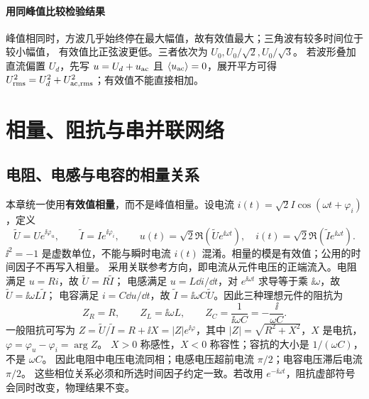 
\paragraph{用同峰值比较检验结果}
峰值相同时，方波几乎始终停在最大幅值，故有效值最大；三角波有较多时间位于较小幅值，
有效值比正弦波更低。三者依次为 $U_0,U_0/\sqrt2,U_0/\sqrt3$。
若波形叠加直流偏置 $U_d$，先写 $u=U_d+u_{\rm ac}$ 且 $\langle u_{\rm ac}\rangle=0$，展开平方可得
$U_{\rm rms}^2=U_d^2+U_{{\rm ac,rms}}^2$；有效值不能直接相加。




\section{相量、阻抗与串并联网络}

\subsection{电阻、电感与电容的相量关系}


本章统一使用\textbf{有效值相量}，而不是峰值相量。设电流
$i(t)=\sqrt2 I\cos(\omega t+\varphi_i)$，定义
\begin{equation}
 \widetilde U=Ue^{\ii\varphi_u},\qquad
 \widetilde I=Ie^{\ii\varphi_i},\qquad
 u(t)=\sqrt2\Re(\widetilde Ue^{\ii\omega t}),\quad
 i(t)=\sqrt2\Re(\widetilde Ie^{\ii\omega t}).
\end{equation}
$\ii^2=-1$ 是虚数单位，不能与瞬时电流 $i(t)$ 混淆。相量的模是有效值；公用的时间因子不再写入相量。
采用关联参考方向，即电流从元件电压的正端流入。电阻满足 $u=Ri$，故 $\widetilde U=R\widetilde I$；
电感满足 $u=L\dd i/\dd t$，对 $e^{\ii\omega t}$ 求导等于乘 $\ii\omega$，故 $\widetilde U=\ii\omega L\widetilde I$；
电容满足 $i=C\dd u/\dd t$，故 $\widetilde I=\ii\omega C\widetilde U$。因此三种理想元件的阻抗为
\begin{equation}
 Z_R=R,\qquad Z_L=\ii\omega L,\qquad Z_C=\frac1{\ii\omega C}=-\frac{\ii}{\omega C}.
\end{equation}
一般阻抗可写为 $Z=\widetilde U/\widetilde I=R+\ii X=|Z|e^{\ii\varphi}$，其中
$|Z|=\sqrt{R^2+X^2}$，$X$ 是电抗，$\varphi=\varphi_u-\varphi_i=\arg Z$。
$X>0$ 称感性，$X<0$ 称容性；容抗的大小是 $1/(\omega C)$，不是 $\omega C$。
因此电阻中电压电流同相；电感电压超前电流 $\pi/2$；电容电压滞后电流 $\pi/2$。
这些相位关系必须和所选时间因子约定一致。若改用 $e^{-\ii\omega t}$，阻抗虚部符号会同时改变，物理结果不变。

